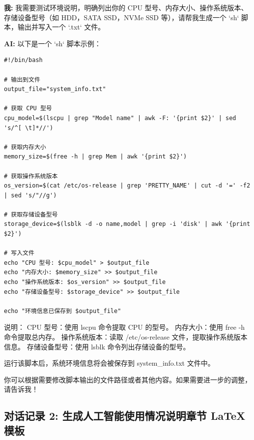 \documentclass[a4paper]{article}
\begin{document}
\begin{tcolorbox}[colframe=blue!30!white, colback=blue!5!white, coltitle=black, title=对话内容]
\textbf{我:} 我需要测试环境说明，明确列出你的 CPU 型号、内存大小、操作系统版本、存储设备型号（如 HDD，SATA SSD，NVMe SSD 等），请帮我生成一个 `sh` 脚本，输出并写入一个 `.txt` 文件。

\textbf{AI:} 以下是一个 `sh` 脚本示例：
\begin{lstlisting}[breaklines=true, basicstyle=\ttfamily\small]
#!/bin/bash

# 输出到文件
output_file="system_info.txt"

# 获取 CPU 型号
cpu_model=$(lscpu | grep "Model name" | awk -F: '{print $2}' | sed 's/^[ \t]*//')

# 获取内存大小
memory_size=$(free -h | grep Mem | awk '{print $2}')

# 获取操作系统版本
os_version=$(cat /etc/os-release | grep 'PRETTY_NAME' | cut -d '=' -f2 | sed 's/"//g')

# 获取存储设备型号
storage_device=$(lsblk -d -o name,model | grep -i 'disk' | awk '{print $2}')

# 写入文件
echo "CPU 型号: $cpu_model" > $output_file
echo "内存大小: $memory_size" >> $output_file
echo "操作系统版本: $os_version" >> $output_file
echo "存储设备型号: $storage_device" >> $output_file

echo "环境信息已保存到 $output_file"
\end{lstlisting}
说明：
CPU 型号：使用 lscpu 命令提取 CPU 的型号。
内存大小：使用 free -h 命令提取总内存。
操作系统版本：读取 /etc/os-release 文件，提取操作系统版本信息。
存储设备型号：使用 lsblk 命令列出存储设备的型号。

运行该脚本后，系统环境信息将会被保存到 system\_info.txt 文件中。

你可以根据需要修改脚本输出的文件路径或者其他内容。如果需要进一步的调整，请告诉我！
\end{tcolorbox}


\subsection{对话记录 2: 生成人工智能使用情况说明章节 LaTeX 模板}
\end{document}
